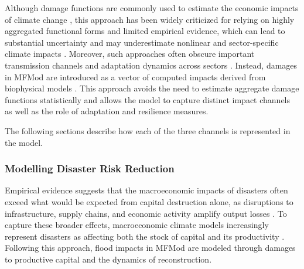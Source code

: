 \documentclass[
  final,
  10pt,
  letterpaper,
  english,
]{article}
\begin{document}
Although damage functions are commonly used to estimate the economic impacts of
climate change \parencite{nordhaus1992optimal,nordhaus1992dice}, this approach
has been widely criticized for relying on highly aggregated functional forms and
limited empirical evidence, which can lead to substantial uncertainty and may
underestimate nonlinear and sector-specific climate impacts
\parencite{pindyck2013climate,stern2013structure}. Moreover, such approaches
often obscure important transmission channels and adaptation dynamics across
sectors \parencite{burke2015global}. Instead, damages in MFMod are introduced as
a vector of computed impacts derived from biophysical models
\parencite{abalo2025macroeconomic}. This approach avoids the need to estimate
aggregate damage functions statistically and allows the model to capture
distinct impact channels as well as the role of adaptation and resilience
measures.

The following sections describe how each of the three channels is represented in
the model.


\subsubsection{Modelling Disaster Risk Reduction}
\label{sec:methods_mfmod_drr}
Empirical evidence suggests that the macroeconomic impacts of disasters often
exceed what would be expected from capital destruction alone, as disruptions to
infrastructure, supply chains, and economic activity amplify output losses
\parencite{von2012unmitigated,bakkensen2018climate}. To capture these broader
effects, macroeconomic climate models increasingly represent disasters as
affecting both the stock of capital and its productivity
\parencite{hallegatte2019losses}. Following this approach, flood impacts in
MFMod are modeled through damages to productive capital and the dynamics of
reconstruction.
\end{document}
